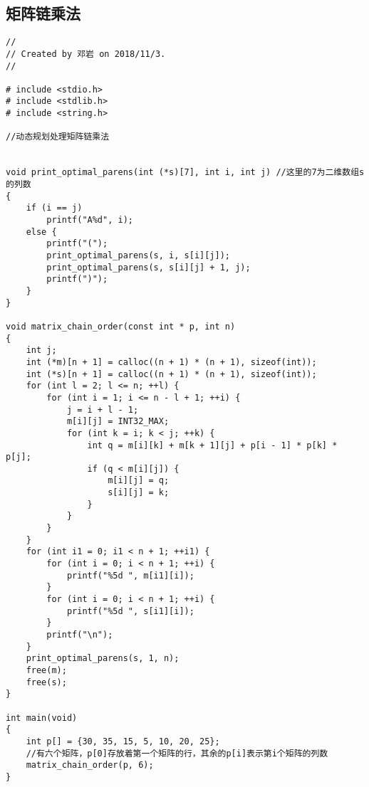 \subsection{矩阵链乘法}
\begin{verbatim}
//
// Created by 邓岩 on 2018/11/3.
//

# include <stdio.h>
# include <stdlib.h>
# include <string.h>

//动态规划处理矩阵链乘法


void print_optimal_parens(int (*s)[7], int i, int j) //这里的7为二维数组s的列数
{
    if (i == j)
        printf("A%d", i);
    else {
        printf("(");
        print_optimal_parens(s, i, s[i][j]);
        print_optimal_parens(s, s[i][j] + 1, j);
        printf(")");
    }
}

void matrix_chain_order(const int * p, int n)
{
    int j;
    int (*m)[n + 1] = calloc((n + 1) * (n + 1), sizeof(int));
    int (*s)[n + 1] = calloc((n + 1) * (n + 1), sizeof(int));
    for (int l = 2; l <= n; ++l) {
        for (int i = 1; i <= n - l + 1; ++i) {
            j = i + l - 1;
            m[i][j] = INT32_MAX;
            for (int k = i; k < j; ++k) {
                int q = m[i][k] + m[k + 1][j] + p[i - 1] * p[k] * p[j];
                if (q < m[i][j]) {
                    m[i][j] = q;
                    s[i][j] = k;
                }
            }
        }
    }
    for (int i1 = 0; i1 < n + 1; ++i1) {
        for (int i = 0; i < n + 1; ++i) {
            printf("%5d ", m[i1][i]);
        }
        for (int i = 0; i < n + 1; ++i) {
            printf("%5d ", s[i1][i]);
        }
        printf("\n");
    }
    print_optimal_parens(s, 1, n);
    free(m);
    free(s);
}

int main(void)
{
    int p[] = {30, 35, 15, 5, 10, 20, 25};
    //有六个矩阵，p[0]存放着第一个矩阵的行，其余的p[i]表示第i个矩阵的列数
    matrix_chain_order(p, 6);
}
\end{verbatim}

